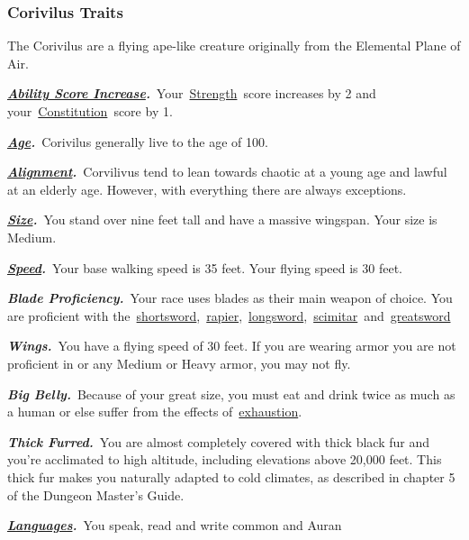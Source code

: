 \subsubsection{\texorpdfstring{\textbf{Corivilus
Traits}}{Corivilus Traits}}\label{corivilus-traits}

The Corivilus are a flying ape-like creature originally from the
Elemental Plane of Air.

\textbf{\emph{\href{https://www.dandwiki.com/wiki/5e_SRD:About_Races\#Ability_Score_Increase}{Ability
Score
Increase}.}}~Your~\href{https://www.dandwiki.com/wiki/5e_SRD:Strength}{Strength}~score
increases by 2 and
your~\href{https://www.dandwiki.com/wiki/5e_SRD:Constitution}{Constitution}~score
by 1.

\textbf{\emph{\href{https://www.dandwiki.com/wiki/5e_SRD:About_Races\#Age}{Age}.}}~Corivilus
generally live to the age of 100.

\textbf{\emph{\href{https://www.dandwiki.com/wiki/5e_SRD:About_Races\#Alignment}{Alignment}.}}~Corvilivus
tend to lean towards chaotic at a young age and lawful at an elderly
age. However, with everything there are always exceptions.

\textbf{\emph{\href{https://www.dandwiki.com/wiki/5e_SRD:About_Races\#Size}{Size}.}}~You
stand over nine feet tall and have a massive wingspan. Your size is
Medium.

\textbf{\emph{\href{https://www.dandwiki.com/wiki/5e_SRD:About_Races\#Speed}{Speed}.}}~Your
base walking speed is 35 feet. Your flying speed is 30 feet.

\textbf{\emph{Blade Proficiency.}}~Your race uses blades as their main
weapon of choice. You are proficient with
the~\href{https://www.dandwiki.com/wiki/5e_SRD:Shortsword}{shortsword},~\href{https://www.dandwiki.com/wiki/5e_SRD:Rapier}{rapier},~\href{https://www.dandwiki.com/wiki/5e_SRD:Longsword}{longsword},~\href{https://www.dandwiki.com/wiki/5e_SRD:Scimitar}{scimitar}~and~\href{https://www.dandwiki.com/wiki/5e_SRD:Greatsword}{greatsword}

\textbf{\emph{Wings.}}~You have a flying speed of 30 feet. If you are
wearing armor you are not proficient in or any Medium or Heavy armor,
you may not fly.

\textbf{\emph{Big Belly.}}~Because of your great size, you must eat and
drink twice as much as a human or else suffer from the effects
of~\href{https://www.dandwiki.com/wiki/5e_SRD:Conditions\#Exhaustion}{exhaustion}.

\textbf{\emph{Thick Furred.}}~You are almost completely covered with
thick black fur and you're acclimated to high altitude, including
elevations above 20,000 feet. This thick fur makes you naturally adapted
to cold climates, as described in chapter 5 of the Dungeon Master's
Guide.

\textbf{\emph{\href{https://www.dandwiki.com/wiki/5e_SRD:About_Races\#Languages}{Languages}.}}~You
speak, read and write common and Auran
